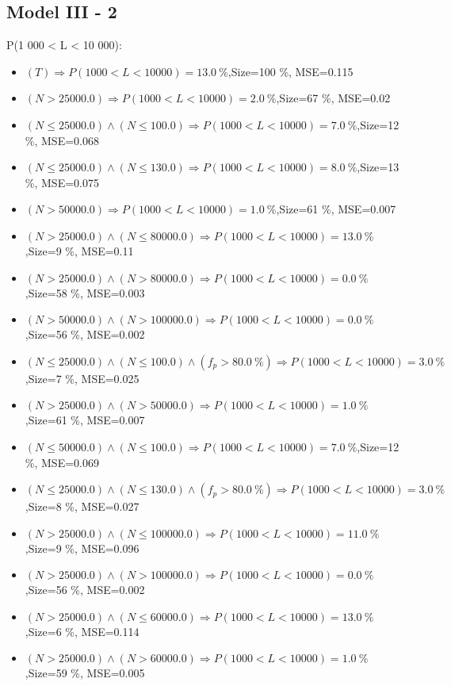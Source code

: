 \documentclass[numbered]{CSL}
\begin{document}
\subsection{Model III - 2}
P(1 000 < L < 10 000):
\begin{itemize}
\item $(T) \Rightarrow P(1 000 < L < 10 000) = 13.0~\%$,\hfill Size=100 \%, MSE=0.115
\item $(N > 25000.0) \Rightarrow P(1 000 < L < 10 000) = 2.0~\%$,\hfill Size=67 \%, MSE=0.02
\item $(N \leq 25000.0) \land (N \leq 100.0) \Rightarrow P(1 000 < L < 10 000) = 7.0~\%$,\hfill Size=12 \%, MSE=0.068
\item $(N \leq 25000.0) \land (N \leq 130.0) \Rightarrow P(1 000 < L < 10 000) = 8.0~\%$,\hfill Size=13 \%, MSE=0.075
\item $(N > 50000.0) \Rightarrow P(1 000 < L < 10 000) = 1.0~\%$,\hfill Size=61 \%, MSE=0.007
\item $(N > 25000.0) \land (N \leq 80000.0) \Rightarrow P(1 000 < L < 10 000) = 13.0~\%$,\hfill Size=9 \%, MSE=0.11
\item $(N > 25000.0) \land (N > 80000.0) \Rightarrow P(1 000 < L < 10 000) = 0.0~\%$,\hfill Size=58 \%, MSE=0.003
\item $(N > 50000.0) \land (N > 100000.0) \Rightarrow P(1 000 < L < 10 000) = 0.0~\%$,\hfill Size=56 \%, MSE=0.002
\item $(N \leq 25000.0) \land (N \leq 100.0) \land (f_p > 80.0~\%) \Rightarrow P(1 000 < L < 10 000) = 3.0~\%$,\hfill Size=7 \%, MSE=0.025
\item $(N > 25000.0) \land (N > 50000.0) \Rightarrow P(1 000 < L < 10 000) = 1.0~\%$,\hfill Size=61 \%, MSE=0.007
\item $(N \leq 50000.0) \land (N \leq 100.0) \Rightarrow P(1 000 < L < 10 000) = 7.0~\%$,\hfill Size=12 \%, MSE=0.069
\item $(N \leq 25000.0) \land (N \leq 130.0) \land (f_p > 80.0~\%) \Rightarrow P(1 000 < L < 10 000) = 3.0~\%$,\hfill Size=8 \%, MSE=0.027
\item $(N > 25000.0) \land (N \leq 100000.0) \Rightarrow P(1 000 < L < 10 000) = 11.0~\%$,\hfill Size=9 \%, MSE=0.096
\item $(N > 25000.0) \land (N > 100000.0) \Rightarrow P(1 000 < L < 10 000) = 0.0~\%$,\hfill Size=56 \%, MSE=0.002
\item $(N > 25000.0) \land (N \leq 60000.0) \Rightarrow P(1 000 < L < 10 000) = 13.0~\%$,\hfill Size=6 \%, MSE=0.114
\item $(N > 25000.0) \land (N > 60000.0) \Rightarrow P(1 000 < L < 10 000) = 1.0~\%$,\hfill Size=59 \%, MSE=0.005

\end{itemize}
\end{document}
